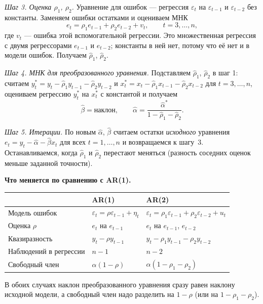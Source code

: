 \begin{solution}
\smallskip
\emph{Шаг 3. Оценка $\rho_1$, $\rho_2$.} Уравнение для ошибок — регрессия
$\varepsilon_t$ на $\varepsilon_{t-1}$ и $\varepsilon_{t-2}$ без константы.
Заменяем ошибки остатками и оцениваем МНК
\[
  e_t = \rho_1e_{t-1} + \rho_2e_{t-2} + v_t, \qquad t = 3, \dots, n ,
\]
где $v_t$ — ошибка этой вспомогательной регрессии. Это множественная
регрессия с двумя регрессорами $e_{t-1}$ и $e_{t-2}$; константы в ней нет,
потому что её нет и в модели ошибок. Получаем $\widehat\rho_1$,
$\widehat\rho_2$.

\smallskip
\emph{Шаг 4. МНК для преобразованного уравнения.} Подставляем
$\widehat\rho_1$, $\widehat\rho_2$ в шаг 1: считаем
$y_t^* = y_t - \widehat\rho_1y_{t-1} - \widehat\rho_2y_{t-2}$ и
$x_t^* = x_t - \widehat\rho_1x_{t-1} - \widehat\rho_2x_{t-2}$ для
$t = 3, \dots, n$, оцениваем регрессию $y_t^*$ на $x_t^*$ с константой и
получаем
\[
  \widehat\beta = \text{наклон},
  \qquad
  \widehat\alpha = \frac{\widehat\alpha^*}{1 - \widehat\rho_1 - \widehat\rho_2} .
\]

\smallskip
\emph{Шаг 5. Итерации.} По новым $\widehat\alpha$, $\widehat\beta$ считаем
остатки \emph{исходного} уравнения $e_t = y_t - \widehat\alpha -
\widehat\beta x_t$ для всех $t = 1, \dots, n$ и возвращаемся к шагу~3.
Останавливаемся, когда $\widehat\rho_1$ и $\widehat\rho_2$ перестают
меняться (разность соседних оценок меньше заданной точности).

\medskip
\noindent\begin{minipage}{\linewidth}
\textbf{Что меняется по сравнению с AR(1).}
\begin{center}
\small
\begin{tabular*}{\linewidth}{@{\extracolsep{\fill}}lll@{}}
\toprule
 & AR(1) & AR(2) \\
\midrule
Модель ошибок & $\varepsilon_t = \rho\varepsilon_{t-1} + \eta_t$
              & $\varepsilon_t = \rho_1\varepsilon_{t-1} + \rho_2\varepsilon_{t-2} + u_t$ \\
Оценка $\rho$ & $e_t$ на $e_{t-1}$ & $e_t$ на $e_{t-1}$, $e_{t-2}$ \\
Квазиразность & $y_t - \rho y_{t-1}$ & $y_t - \rho_1y_{t-1} - \rho_2y_{t-2}$ \\
Наблюдений в регрессии & $n - 1$ & $n - 2$ \\
Свободный член & $\alpha(1 - \rho)$ & $\alpha(1 - \rho_1 - \rho_2)$ \\
\bottomrule
\end{tabular*}
\end{center}
\end{minipage}
В обоих случаях наклон преобразованного уравнения сразу равен наклону
исходной модели, а свободный член надо разделить на $1 - \rho$ (или на
$1 - \rho_1 - \rho_2$).
\end{solution}
